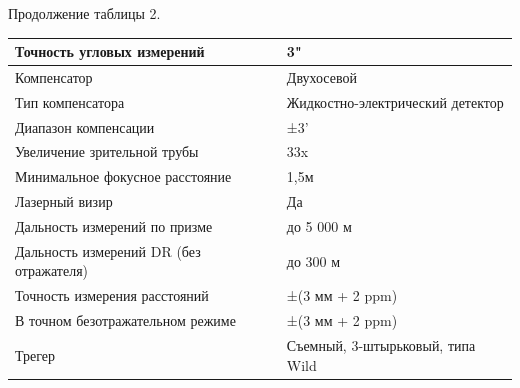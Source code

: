 \documentclass[a4paper]{article}
\begin{document}
\begin{newpage}
    
    \begin{center}
        \begin{flushleft}
            Продолжение таблицы 2.
        \end{flushleft}
     
        \begin{tabular}{ | p{200pt} | p{260pt} | }
            \hline
            Точность угловых измерений & 3"\\
            \hline
            Компенсатор &Двухосевой\\
            \hline
            Тип компенсатора & Жидкостно-электрический детектор\\
            \hline
            Диапазон компенсации & ±3'\\
            \hline
            Увеличение зрительной трубы & 33x\\
            \hline
            Минимальное фокусное расстояние  & 1,5м\\
            \hline
            Лазерный визир & Да\\
            \hline
            Дальность измерений по призме & до 5 000 м\\
            \hline
            Дальность измерений DR (без отражателя)  & до 300 м\\
            \hline
            Точность измерения расстояний & ±(3 мм + 2 ppm)\\
            \hline
            В точном безотражательном режиме & ±(3 мм + 2 ppm)\\
            \hline
            Трегер & Съемный, 3-штырьковый, типа Wild\\
            \hline
        \end{tabular}
    \end{center}

\end{newpage}
\end{document}
